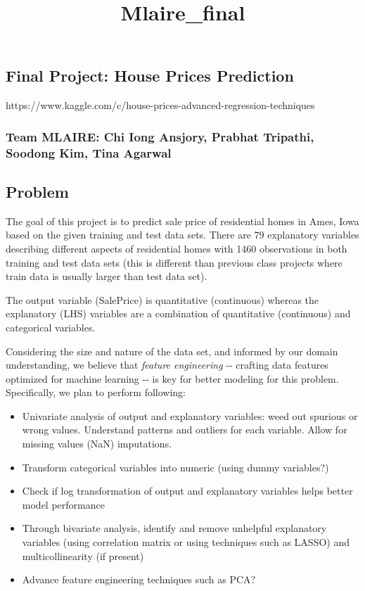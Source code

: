 \documentclass[11pt]{article}
\title{Mlaire\_final}
\providecommand{\tightlist}{%
      \setlength{\itemsep}{0pt}\setlength{\parskip}{0pt}}
\begin{document}
    
    
    \maketitle
    
    

    
    \subsection{Final Project: House Prices
Prediction}\label{final-project-house-prices-prediction}

https://www.kaggle.com/c/house-prices-advanced-regression-techniques

\subsubsection{Team MLAIRE: Chi Iong Ansjory, Prabhat Tripathi, Soodong
Kim, Tina
Agarwal}\label{team-mlaire-chi-iong-ansjory-prabhat-tripathi-soodong-kim-tina-agarwal}

    \subsection{Problem}\label{problem}

    The goal of this project is to predict sale price of residential homes
in Ames, Iowa based on the given training and test data sets. There are
79 explanatory variables describing different aspects of residential
homes with 1460 observations in both training and test data sets (this
is different than previous class projects where train data is usually
larger than test data set).

The output variable (SalePrice) is quantitative (continuous) whereas the
explanatory (LHS) variables are a combination of quantitative
(continuous) and categorical variables.

Considering the size and nature of the data set, and informed by our
domain understanding, we believe that \emph{feature engineering} -\/-
crafting data features optimized for machine learning -\/- is key for
better modeling for this problem. Specifically, we plan to perform
following:

\begin{itemize}
\tightlist
\item
  Univariate analysis of output and explanatory variables: weed out
  spurious or wrong values. Understand patterns and outliers for each
  variable. Allow for missing values (NaN) imputations.
\item
  Transform categorical variables into numeric (using dummy variables?)
\item
  Check if log transformation of output and explanatory variables helps
  better model performance
\item
  Through bivariate analysis, identify and remove unhelpful explanatory
  variables (using correlation matrix or using techniques such as LASSO)
  and multicollinearity (if present)
\item
  Advance feature engineering techniques such as PCA?
\end{itemize}
\end{document}
